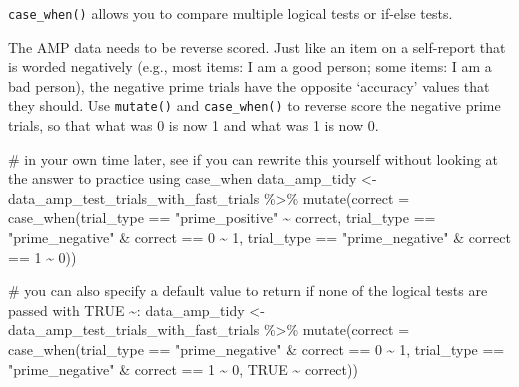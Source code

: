 \documentclass[
  letterpaper,
  DIV=11,
  numbers=noendperiod]{scrreprt}
\newenvironment{Shaded}{\begin{snugshade}}{\end{snugshade}}
\newcommand{\AttributeTok}[1]{\textcolor[rgb]{0.40,0.45,0.13}{#1}}
\newcommand{\CommentTok}[1]{\textcolor[rgb]{0.37,0.37,0.37}{#1}}
\newcommand{\ConstantTok}[1]{\textcolor[rgb]{0.56,0.35,0.01}{#1}}
\newcommand{\DecValTok}[1]{\textcolor[rgb]{0.68,0.00,0.00}{#1}}
\newcommand{\FunctionTok}[1]{\textcolor[rgb]{0.28,0.35,0.67}{#1}}
\newcommand{\NormalTok}[1]{\textcolor[rgb]{0.00,0.23,0.31}{#1}}
\newcommand{\OtherTok}[1]{\textcolor[rgb]{0.00,0.23,0.31}{#1}}
\newcommand{\SpecialCharTok}[1]{\textcolor[rgb]{0.37,0.37,0.37}{#1}}
\newcommand{\StringTok}[1]{\textcolor[rgb]{0.13,0.47,0.30}{#1}}
\begin{document}
\texttt{case\_when()} allows you to compare multiple logical tests or
if-else tests.

The AMP data needs to be reverse scored. Just like an item on a
self-report that is worded negatively (e.g., most items: I am a good
person; some items: I am a bad person), the negative prime trials have
the opposite `accuracy' values that they should. Use \texttt{mutate()}
and \texttt{case\_when()} to reverse score the negative prime trials, so
that what was 0 is now 1 and what was 1 is now 0.

\begin{Shaded}
\begin{Highlighting}[]
\CommentTok{\# in your own time later, see if you can rewrite this yourself without looking at the answer to practice using case\_when}
\NormalTok{data\_amp\_tidy }\OtherTok{\textless{}{-}}\NormalTok{ data\_amp\_test\_trials\_with\_fast\_trials }\SpecialCharTok{\%\textgreater{}\%}
  \FunctionTok{mutate}\NormalTok{(}\AttributeTok{correct =} \FunctionTok{case\_when}\NormalTok{(trial\_type }\SpecialCharTok{==} \StringTok{"prime\_positive"} \SpecialCharTok{\textasciitilde{}}\NormalTok{ correct,}
\NormalTok{                             trial\_type }\SpecialCharTok{==} \StringTok{"prime\_negative"} \SpecialCharTok{\&}\NormalTok{ correct }\SpecialCharTok{==} \DecValTok{0} \SpecialCharTok{\textasciitilde{}} \DecValTok{1}\NormalTok{,}
\NormalTok{                             trial\_type }\SpecialCharTok{==} \StringTok{"prime\_negative"} \SpecialCharTok{\&}\NormalTok{ correct }\SpecialCharTok{==} \DecValTok{1} \SpecialCharTok{\textasciitilde{}} \DecValTok{0}\NormalTok{))}

\CommentTok{\# you can also specify a default value to return if none of the logical tests are passed with \textquotesingle{}TRUE \textasciitilde{}\textquotesingle{}:}
\NormalTok{data\_amp\_tidy }\OtherTok{\textless{}{-}}\NormalTok{ data\_amp\_test\_trials\_with\_fast\_trials }\SpecialCharTok{\%\textgreater{}\%}
  \FunctionTok{mutate}\NormalTok{(}\AttributeTok{correct =} \FunctionTok{case\_when}\NormalTok{(trial\_type }\SpecialCharTok{==} \StringTok{"prime\_negative"} \SpecialCharTok{\&}\NormalTok{ correct }\SpecialCharTok{==} \DecValTok{0} \SpecialCharTok{\textasciitilde{}} \DecValTok{1}\NormalTok{,}
\NormalTok{                             trial\_type }\SpecialCharTok{==} \StringTok{"prime\_negative"} \SpecialCharTok{\&}\NormalTok{ correct }\SpecialCharTok{==} \DecValTok{1} \SpecialCharTok{\textasciitilde{}} \DecValTok{0}\NormalTok{,}
                             \ConstantTok{TRUE} \SpecialCharTok{\textasciitilde{}}\NormalTok{ correct))}
\end{Highlighting}
\end{Shaded}
\end{document}
